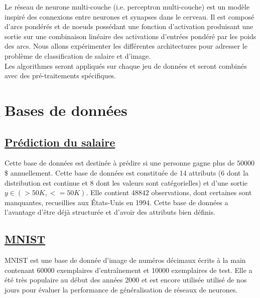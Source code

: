 \documentclass[12pt,letterpaper]{article}
\begin{document}
Le réseau de neurone multi-couche (i.e. perceptron multi-couche) est un modèle
inspiré des connexions entre neurones et synapses dans le cerveau. Il est
composé d'arcs pondérés et de noeuds possédant une fonction d'activation
produisant une sortie sur une combinaison linéaire des activations d'entrées
pondéré par les poids des arcs. Nous allons expérimenter les différentes
architectures pour adresser le problème de classification de salaire et
d'image.
\\

Les algorithmes seront appliqués sur chaque jeu de données et seront combinés
avec des pré-traitements spécifiques.

\section{Bases de données}
\subsection{\href{http://archive.ics.uci.edu/ml/datasets/Adult}{Prédiction du salaire}}

Cette base de données est destinée à prédire si une personne gagne plus
de $50 000$\$ annuellement. Cette base de données est constituée de 14 attributs
(6 dont la distribution est continue et 8 dont les valeurs sont catégorielles)
et d'une sortie $y \in \left( >50K, <=50K \right)$. Elle contient $48 842$
observations, dont certaines sont manquantes, recueillies aux États-Unis en
1994. Cette base de données a l'avantage d'être déjà structurée et d'avoir des
attributs bien définis.

\subsection{\href{http://yann.lecun.com/exdb/mnist/}{MNIST}}

MNIST est une base de donnée d'image de numéros décimaux écrits à la main
contenant 60000 exemplaires d'entraînement et 10000 exemplaires de test. Elle a
été très populaire au début des années 2000 et est encore utilisée utilisé de
nos jours pour évaluer la performance de généralisation de réseaux de neurones.
\end{document}
